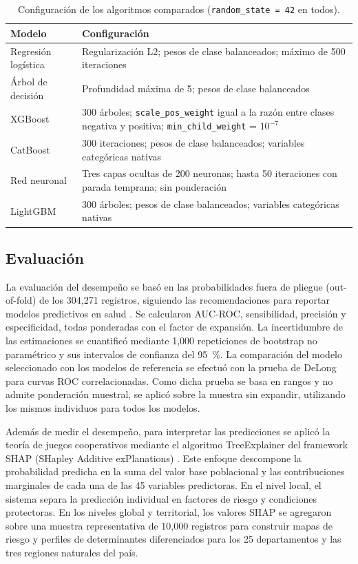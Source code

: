 \documentclass[final,5p,times,twocolumn,authoryear,lefttitle]{elsarticle}
\begin{document}
\begin{table}[!tp]
\centering
\caption{Configuración de los algoritmos comparados (\texttt{random\_state = 42} en todos).}
\label{tab:hiperparametros}
\small
\begin{tabular}{p{2.4cm}p{5.3cm}}
\hline
Modelo & Configuración \\
\hline
Regresión logística & Regularización L2; pesos de clase balanceados; máximo de 500 iteraciones \\
Árbol de decisión & Profundidad máxima de 5; pesos de clase balanceados \\
XGBoost & 300 árboles; \texttt{scale\_pos\_weight} igual a la razón entre clases negativa y positiva; \texttt{min\_child\_weight} = $10^{-7}$ \\
CatBoost & 300 iteraciones; pesos de clase balanceados; variables categóricas nativas \\
Red neuronal & Tres capas ocultas de 200 neuronas; hasta 50 iteraciones con parada temprana; sin ponderación \\
LightGBM & 300 árboles; pesos de clase balanceados; variables categóricas nativas \\
\hline
\end{tabular}
\end{table}

\subsection{Evaluación}

La evaluación del desempeño se basó en las probabilidades fuera de pliegue (out-of-fold) de los 304,271 registros, siguiendo las recomendaciones para reportar modelos predictivos en salud \citep{moons2015tripod}. Se calcularon AUC-ROC, sensibilidad, precisión y especificidad, todas ponderadas con el factor de expansión. La incertidumbre de las estimaciones se cuantificó mediante 1,000 repeticiones de bootstrap no paramétrico y sus intervalos de confianza del 95~\%. La comparación del modelo seleccionado con los modelos de referencia se efectuó con la prueba de DeLong para curvas ROC correlacionadas. Como dicha prueba se basa en rangos y no admite ponderación muestral, se aplicó sobre la muestra sin expandir, utilizando los mismos individuos para todos los modelos.

Además de medir el desempeño, para interpretar las predicciones se aplicó la teoría de juegos cooperativos mediante el algoritmo TreeExplainer del framework SHAP (SHapley Additive exPlanations) \citep{lundberg2017shap}. Este enfoque descompone la probabilidad predicha en la suma del valor base poblacional y las contribuciones marginales de cada una de las 45 variables predictoras. En el nivel local, el sistema separa la predicción individual en factores de riesgo y condiciones protectoras. En los niveles global y territorial, los valores SHAP se agregaron sobre una muestra representativa de 10,000 registros para construir mapas de riesgo y perfiles de determinantes diferenciados para los 25 departamentos y las tres regiones naturales del país.
\end{document}
